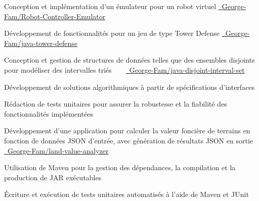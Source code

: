 \documentclass[letterpaper,10pt]{article}
\begin{document}
    \begin{resume_list}
      \item Conception et implémentation d’un émulateur pour un robot virtuel {\small \href{https://github.com/George-Fam/Robot-Controller-Emulator}{\faGithubSquare\ George-Fam/Robot-Controller-Emulator}}
      \vspace{2pt}
      \item Développement de fonctionnalités pour un jeu de type Tower Defense {\small \href{https://github.com/George-Fam/java-tower-defense}{\faGithubSquare\ George-Fam/java-tower-defense}}
      \vspace{2pt}
      \item Conception et gestion de structures de données telles que des ensembles disjoints pour modéliser des intervalles triés\ \ \ \  {\small \href{https://github.com/George-Fam/java-disjoint-interval-set}{\faGithubSquare\ George-Fam/java-disjoint-interval-set}}
      \vspace{2pt}
      \item Développement de solutions algorithmiques à partir de spécifications d’interfaces
      \vspace{2pt}
      \item Rédaction de tests unitaires pour assurer la robustesse et la fiabilité des fonctionnalités implémentées
    \end{resume_list}

  \begin{resume_list}
  \item Développement d’une application pour calculer la valeur foncière de terrains en fonction de données JSON d’entrée, avec génération de résultats JSON en sortie {\small \href{https://github.com/George-Fam/land-value-analyzer}{\faGithubSquare\ George-Fam/land-value-analyzer}}
    \vspace{2pt}
    \item Utilisation de Maven pour la gestion des dépendances, la compilation et la production de JAR exécutables
    \vspace{2pt}
    \item Écriture et exécution de tests unitaires automatisés à l'aide de Maven et JUnit
  \end{resume_list}
  
\end{document}
